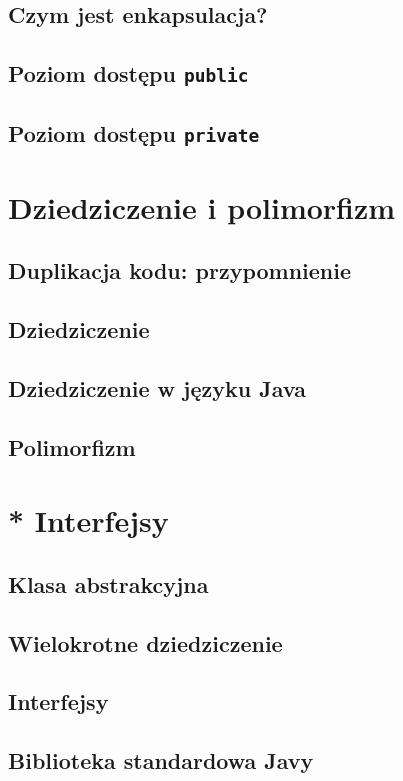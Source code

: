 \documentclass[11pt]{book}
\begin{document}
\section{Czym jest enkapsulacja?}
\section{Poziom dostępu \texttt{public}}
\section{Poziom dostępu \texttt{private}}

\chapter{Dziedziczenie i polimorfizm}
\section{Duplikacja kodu: przypomnienie}
\section{Dziedziczenie}
\section{Dziedziczenie w języku Java}
\section{Polimorfizm}

\chapter{* Interfejsy}
\section{Klasa abstrakcyjna}
\section{Wielokrotne dziedziczenie}
\section{Interfejsy}
\section{Biblioteka standardowa Javy}
\end{document}
